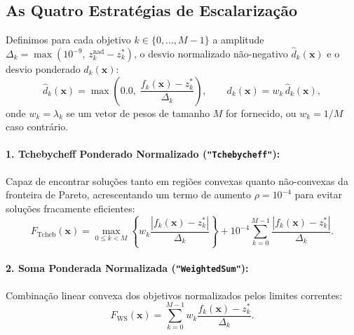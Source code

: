 \documentclass[11pt,a4paper]{article}
\begin{document}
\subsection{As Quatro Estratégias de Escalarização}

Definimos para cada objetivo $k \in \{0, \dots, M-1\}$ a amplitude $\Delta_k = \max(10^{-9},\, z^{\text{nad}}_k - z^*_k)$, o desvio normalizado não-negativo $\hat{d}_k(\mathbf{x})$ e o desvio ponderado $d_k(\mathbf{x})$:
\begin{equation}
  \hat{d}_k(\mathbf{x}) = \max\!\left(0.0,\; \frac{f_k(\mathbf{x}) - z^*_k}{\Delta_k}\right),
  \qquad
  d_k(\mathbf{x}) = w_k \, \hat{d}_k(\mathbf{x}),
  \label{eq:regret_norm}
\end{equation}
onde $w_k = \lambda_k$ se um vetor de pesos de tamanho $M$ for fornecido, ou $w_k = 1/M$ caso contrário.

\paragraph{1. Tchebycheff Ponderado Normalizado (\texttt{"Tchebycheff"}):}
Capaz de encontrar soluções tanto em regiões convexas quanto não-convexas da fronteira de Pareto, acrescentando um termo de aumento $\rho = 10^{-4}$ para evitar soluções fracamente eficientes:
\begin{equation}
  F_{\text{Tcheb}}(\mathbf{x}) = \max_{0 \le k < M} \left\{ w_k \frac{|f_k(\mathbf{x}) - z^*_k|}{\Delta_k} \right\}
  + 10^{-4} \sum_{k=0}^{M-1} \frac{|f_k(\mathbf{x}) - z^*_k|}{\Delta_k}.
  \label{eq:tcheb}
\end{equation}

\paragraph{2. Soma Ponderada Normalizada (\texttt{"WeightedSum"}):}
Combinação linear convexa dos objetivos normalizados pelos limites correntes:
\begin{equation}
  F_{\text{WS}}(\mathbf{x}) = \sum_{k=0}^{M-1} w_k \frac{f_k(\mathbf{x}) - z^*_k}{\Delta_k}.
  \label{eq:ws}
\end{equation}
\end{document}
